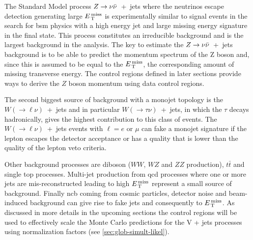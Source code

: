 The Standard Model process $Z \rightarrow \nu \bar{\nu}$~+~jets where the neutrinos escape detection
generating large $E_\mathrm{\, T}^\mathrm{\, miss}$ is experimentally similar to signal events in the search
for \gls{bsm} physics with a high energy jet and large missing energy signature
in the final state. This process constitutes an irreducible background and is
the largest background in the analysis. The key to estimate the $Z \rightarrow \nu \bar{\nu}$~+~jets
background is to be able to predict the momentum spectrum of the Z boson and,
since this is assumed to be equal to the $E_\mathrm{\, T}^\mathrm{\, miss}$, the corresponding amount of
missing transverse energy. The control regions defined in later sections provide
ways to derive the $Z$ boson momentum using data control regions.

The second biggest source of background with a monojet topology is the
$W (\rightarrow \ell \nu)$~+~jets and in particular
$W (\rightarrow \tau \nu)$~+~jets, in which the $\tau$ decays hadronically,
gives the highest contribution to this class of events. The
$W (\rightarrow \ell \nu)$~+~jets events with $\ell = e$ or $\mu$ can fake a
monojet signature if the lepton escapes the detector acceptance or has a quality
that is lower than the quality of the lepton veto criteria.

Other background processes are diboson ($WW$, $WZ$ and $ZZ$ production),
$t \bar{t}$ and single top processes. Multi-jet production from \gls{qcd}
processes where one or more jets are mis-reconstructed leading to high $E_\mathrm{\, T}^\mathrm{\, miss}$
represent a small source of background. Finally \gls{ncb} coming from cosmic
particles, detector noise and beam-induced background can give rise to fake jets
and consequently to $E_\mathrm{\, T}^\mathrm{\, miss}$. As discussed in more details in the upcoming
sections the control regions will be used to effectively scale the Monte Carlo
predictions for the V + jets processes using normalization factors (see
\cref{sec:glob-simult-likel}).
